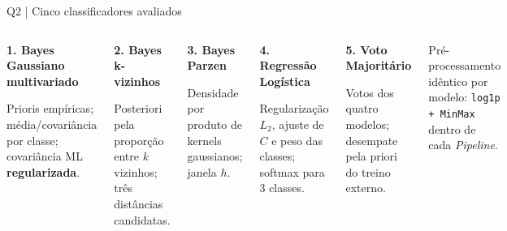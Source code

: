 \documentclass[aspectratio=169,11pt]{beamer}
\begin{document}
\begin{frame}[t]{Q2 | Cinco classificadores avaliados}

\begin{columns}[T,onlytextwidth]
\begin{simplebox}\small \textbf{1. Bayes Gaussiano multivariado}\par\scriptsize Prioris empíricas; média/covariância por classe; covariância ML \textbf{regularizada}.\end{simplebox}
\begin{simplebox}\small \textbf{2. Bayes k-vizinhos}\par\scriptsize Posteriori pela proporção entre $k$ vizinhos; três distâncias candidatas.\end{simplebox}
\begin{simplebox}\small \textbf{3. Bayes Parzen}\par\scriptsize Densidade por produto de kernels gaussianos; janela $h$.\end{simplebox}
\begin{simplebox}\small \textbf{4. Regressão Logística}\par\scriptsize Regularização $L_2$, ajuste de $C$ e peso das classes; softmax para 3 classes.\end{simplebox}
\begin{simplebox}\small \textbf{5. Voto Majoritário}\par\scriptsize Votos dos quatro modelos; desempate pela priori do treino externo.\end{simplebox}
\vspace{1mm}\begin{notabox}\scriptsize Pré-processamento idêntico por modelo: \texttt{log1p + MinMax} dentro de cada \textit{Pipeline}.\end{notabox}
\end{columns}

\end{frame}
\end{document}
